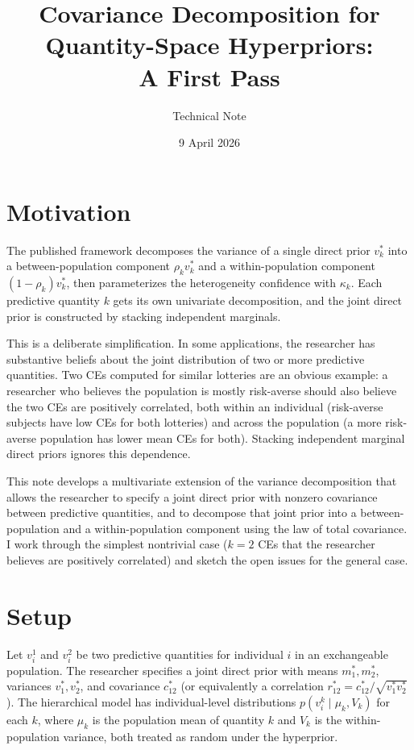 \documentclass[11pt,a4paper]{article}
\title{Covariance Decomposition for Quantity-Space Hyperpriors:\\
A First Pass}
\author{Technical Note}
\date{9 April 2026}
\theoremstyle{definition}
\newcommand{\dpm}{m^*}
\newcommand{\dpv}{v^*}
\newcommand{\dpc}{c^*}
\newcommand{\dpr}{r^*}
\begin{document}
\maketitle

\section{Motivation}

The published framework decomposes the variance of a single direct prior
$\dpv_k$ into a between-population component $\rho_k \dpv_k$ and a
within-population component $(1-\rho_k) \dpv_k$, then parameterizes the
heterogeneity confidence with $\kappa_k$. Each predictive quantity $k$
gets its own univariate decomposition, and the joint direct prior is
constructed by stacking independent marginals.

This is a deliberate simplification. In some applications, the researcher
has substantive beliefs about the joint distribution of two or more
predictive quantities. Two CEs computed for similar lotteries are an
obvious example: a researcher who believes the population is mostly
risk-averse should also believe the two CEs are positively correlated,
both within an individual (risk-averse subjects have low CEs for both
lotteries) and across the population (a more risk-averse population has
lower mean CEs for both). Stacking independent marginal direct priors
ignores this dependence.

This note develops a multivariate extension of the variance decomposition
that allows the researcher to specify a joint direct prior with nonzero
covariance between predictive quantities, and to decompose that joint
prior into a between-population and a within-population component using
the law of total covariance. I work through the simplest nontrivial case
($k = 2$ CEs that the researcher believes are positively correlated) and
sketch the open issues for the general case.

\section{Setup}

Let $v_i^1$ and $v_i^2$ be two predictive quantities for individual $i$
in an exchangeable population. The researcher specifies a joint direct
prior with means $\dpm_1, \dpm_2$, variances $\dpv_1, \dpv_2$, and
covariance $\dpc_{12}$ (or equivalently a correlation
$\dpr_{12} = \dpc_{12} / \sqrt{\dpv_1 \dpv_2}$). The hierarchical model
has individual-level distributions $p(v_i^k \mid \mu_k, V_k)$ for each
$k$, where $\mu_k$ is the population mean of quantity $k$ and $V_k$ is
the within-population variance, both treated as random under the
hyperprior.
\end{document}
